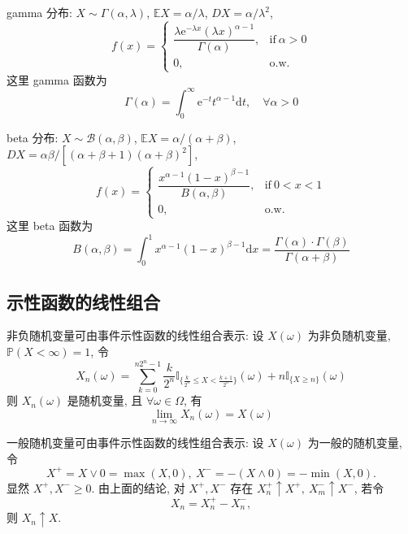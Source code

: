 \documentclass[openany]{ctexbook}
\theoremstyle{kaiti}
\theoremstyle{normal}
\begin{document}
gamma 分布: $X\sim \Gamma(\alpha,\lambda)$, $\mathbb{E}X=\alpha/\lambda$, $DX=\alpha/\lambda^2$,
\begin{equation}
  f(x)=\begin{cases}\dfrac{\lambda\mathrm{e}^{-\lambda x}(\lambda x)^{\alpha-1}}{\Gamma(\alpha)},&\text{if}~\alpha>0\\0,&\text{o.w.}\end{cases}
\end{equation}
这里 gamma 函数为
\begin{equation}
  \Gamma(\alpha)=\int_0^\infty \mathrm{e}^{-t}t^{\alpha-1}\mathrm{d}t,\quad\forall \alpha>0
\end{equation}

beta 分布: $X\sim \mathcal{B}(\alpha,\beta)$, $\mathbb{E}X=\alpha/(\alpha+\beta)$, $DX=\alpha\beta/[(\alpha+\beta+1)(\alpha+\beta)^2]$,
\begin{equation}
  f(x)=\begin{cases}\dfrac{x^{\alpha-1}(1-x)^{\beta-1}}{B(\alpha,\beta)},&\text{if}~0<x<1\\0,&\text{o.w.}\end{cases}
\end{equation}
这里 beta 函数为
\begin{equation}
  B(\alpha,\beta)=\int_0^1 x^{\alpha-1}(1-x)^{\beta-1}\mathrm{d}x=\frac{\Gamma(\alpha)\cdot\Gamma(\beta)}{\Gamma(\alpha+\beta)}
\end{equation}

\subsection{示性函数的线性组合}

非负随机变量可由事件示性函数的线性组合表示: 设 $X(\omega)$ 为非负随机变量, $\mathbb{P}(X<\infty)=1$, 令
\begin{equation}
  X_n(\omega)=\sum_{k=0}^{n2^n-1}\frac{k}{2^n}\mathbb{I}_{\{\frac{k}{2^n}\leqslant X<\frac{k+1}{2^n}\}}(\omega)+n\mathbb{I}_{\{X\geqslant n\}}(\omega)
\end{equation}
则 $X_n(\omega)$ 是随机变量, 且 $\forall\omega\in\Omega$, 有
\begin{equation}
  \lim_{n\to\infty}X_n(\omega)=X(\omega)
\end{equation}

一般随机变量可由事件示性函数的线性组合表示: 设 $X(\omega)$ 为一般的随机变量, 令
\begin{equation}
  X^+=X\vee0=\max(X,0),~X^-=-(X\wedge0)=-\min(X,0).
\end{equation}
显然 $X^+,X^-\geqslant0$. 由上面的结论, 对 $X^+,X^-$ 存在 $X_n^+\uparrow X^+,~X_m^-\uparrow X^-$, 若令
\begin{equation}
  X_n=X_n^+-X_n^-,
\end{equation}
则 $X_n\uparrow X$.
\end{document}
